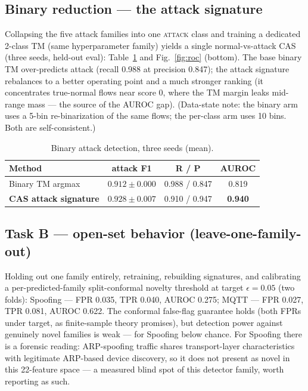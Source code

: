 \documentclass[conference]{IEEEtran}
\begin{document}
\subsection{Binary reduction --- the attack signature}
\label{sec:binary}
Collapsing the five attack families into one \textsc{attack} class and
training a dedicated 2-class TM (same hyperparameter family) yields a single
normal-vs-attack CAS (three seeds, held-out eval):
Table~\ref{tab:binary} and Fig.~\ref{fig:roc} (bottom). The base
binary TM over-predicts attack (recall 0.988 at precision 0.847); the attack
signature rebalances to a better operating point and a much stronger ranking
(it concentrates true-normal flows near score 0, where the TM margin leaks
mid-range mass --- the source of the AUROC gap). (Data-state note: the binary arm uses a 5-bin re-binarization of
the same flows; the per-class arm uses 10 bins. Both are self-consistent.)

\begin{table}[t]
\centering
\caption{Binary attack detection, three seeds (mean).}
\label{tab:binary}
\begin{tabular}{lccc}
\toprule
Method & attack F1 & R / P & AUROC \\
\midrule
Binary TM argmax & $0.912 \pm 0.000$ & 0.988 / 0.847 & 0.819 \\
\textbf{CAS attack signature} & $\mathbf{0.928 \pm 0.007}$ & 0.910 / 0.947 & \textbf{0.940} \\
\bottomrule
\end{tabular}
\end{table}

\subsection{Task B --- open-set behavior (leave-one-family-out)}
\label{sec:taskb}
Holding out one family entirely, retraining, rebuilding signatures, and
calibrating a per-predicted-family split-conformal novelty threshold at
target $\epsilon = 0.05$ (two folds): Spoofing --- FPR 0.035, TPR 0.040,
AUROC 0.275; MQTT --- FPR 0.027, TPR 0.081, AUROC 0.622. The conformal
false-flag guarantee holds (both FPRs under target, as finite-sample theory
promises), but detection power against genuinely novel families is weak ---
for Spoofing below chance. For Spoofing there is a forensic reading:
ARP-spoofing traffic shares transport-layer characteristics with legitimate
ARP-based device discovery, so it does not present as novel in this
22-feature space --- a measured blind spot of this detector family, worth
reporting as such.
\end{document}
